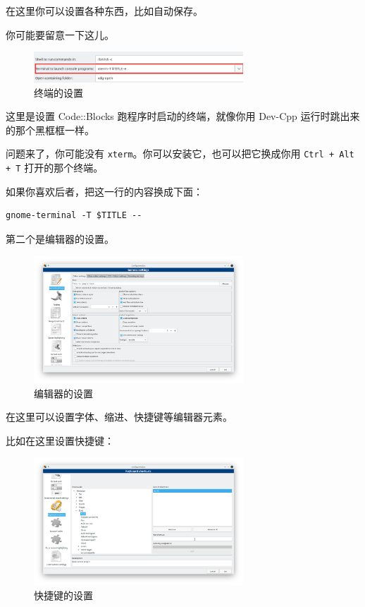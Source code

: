 \documentclass[UTF-8]{ctexart}
\begin{document}
				在这里你可以设置各种东西，比如自动保存。
			
				你可能要留意一下这儿。
				
				\begin{figure}[H]
					\centering
					\includegraphics[width=0.7\textwidth]{fig/cb_settings_environment_console.png}
					\caption*{终端的设置}
				\end{figure}
			
				这里是设置 Code::Blocks 跑程序时启动的终端，就像你用 Dev-Cpp 运行时跳出来的那个黑框框一样。
				
				问题来了，你可能没有 \texttt{xterm}。你可以安装它，也可以把它换成你用 \texttt{Ctrl + Alt + T} 打开的那个终端。
				
				如果你喜欢后者，把这一行的内容换成下面：
			
				\begin{verbatim}
gnome-terminal -T $TITLE --
				\end{verbatim}
				
				第二个是编辑器的设置。
				
				\begin{figure}[H]
					\centering
					\includegraphics[width=0.7\textwidth]{fig/cb_settings_editor.png}
					\caption*{编辑器的设置}
				\end{figure}
			
				在这里可以设置字体、缩进、快捷键等编辑器元素。
				
				比如在这里设置快捷键：
				
				\begin{figure}[H]
					\centering
					\includegraphics[width=0.7\textwidth]{fig/cb_settings_hotkey.png}
					\caption*{快捷键的设置}
				\end{figure}
				
\end{document}
